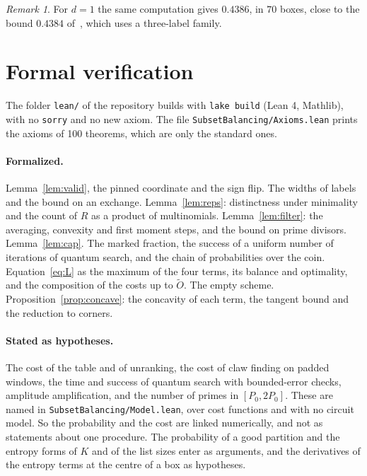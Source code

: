 \documentclass[11pt]{article}
\theoremstyle{remark}
\newtheorem{remark}[theorem]{Remark}
\newcommand{\Ot}{\tilde O}
\begin{document}
\begin{remark}
For $d=1$ the same computation gives $0.4386$, in $70$ boxes, close to the bound $0.4384$ of~\cite{Sen26}, which uses a three-label family.
\end{remark}

\section{Formal verification}\label{sec:lean}

The folder \texttt{lean/} of the repository builds with \texttt{lake build} (Lean 4, Mathlib), with no \texttt{sorry} and no new axiom. The file \texttt{SubsetBalancing/Axioms.lean} prints the axioms of 100 theorems, which are only the standard ones.

\paragraph{Formalized.} Lemma~\ref{lem:valid}, the pinned coordinate and the sign flip. The widths of labels and the bound on an exchange. Lemma~\ref{lem:reps}: distinctness under minimality and the count of $R$ as a product of multinomials. Lemma~\ref{lem:filter}: the averaging, convexity and first moment steps, and the bound on prime divisors. Lemma~\ref{lem:cap}. The marked fraction, the success of a uniform number of iterations of quantum search, and the chain of probabilities over the coin. Equation~\eqref{eq:L} as the maximum of the four terms, its balance and optimality, and the composition of the costs up to $\Ot$. The empty scheme. Proposition~\ref{prop:concave}: the concavity of each term, the tangent bound and the reduction to corners.

\paragraph{Stated as hypotheses.} The cost of the table and of unranking, the cost of claw finding on padded windows, the time and success of quantum search with bounded-error checks, amplitude amplification, and the number of primes in $[P_0,2P_0]$. These are named in \texttt{SubsetBalancing/Model.lean}, over cost functions and with no circuit model. So the probability and the cost are linked numerically, and not as statements about one procedure. The probability of a good partition and the entropy forms of $K$ and of the list sizes enter as arguments, and the derivatives of the entropy terms at the centre of a box as hypotheses.
\end{document}
